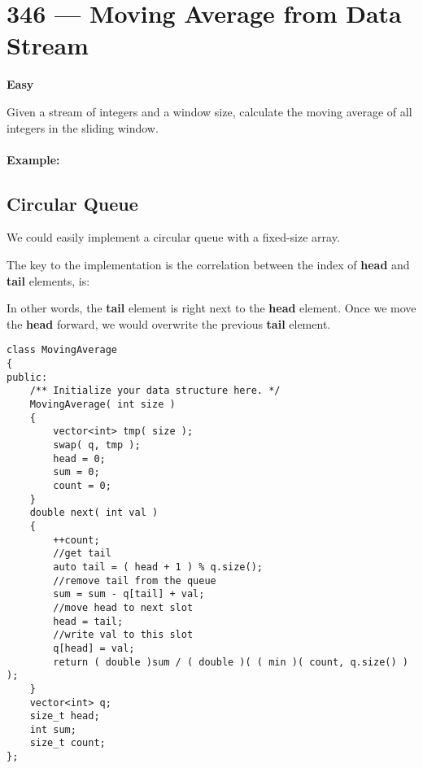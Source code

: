 \section{346 --- Moving Average from Data Stream}

\textbf{Easy}

Given a stream of integers and a window size, calculate the moving average of all integers in the sliding window.

\paragraph{Example:}

\begin{flushleft}




\end{flushleft}

\subsection{Circular Queue}
We could easily implement a circular queue with a fixed-size array. 

The key to the implementation is the correlation between the index of \textbf{head} and \textbf{tail} elements, is:


In other words, the \textbf{tail} element is right next to the \textbf{head} element. Once we move the \textbf{head} forward, we would overwrite the previous \textbf{tail} element.

\setcounter{lstlisting}{0}
\begin{lstlisting}[style=customc, caption={Circular Queue}]
class MovingAverage
{
public:
    /** Initialize your data structure here. */
    MovingAverage( int size )
    {
        vector<int> tmp( size );
        swap( q, tmp );
        head = 0;
        sum = 0;
        count = 0;
    }
    double next( int val )
    {
        ++count;
        //get tail
        auto tail = ( head + 1 ) % q.size();
        //remove tail from the queue
        sum = sum - q[tail] + val;
        //move head to next slot
        head = tail;
        //write val to this slot
        q[head] = val;
        return ( double )sum / ( double )( ( min )( count, q.size() ) );
    }
    vector<int> q;
    size_t head;
    int sum;
    size_t count;
};
\end{lstlisting}